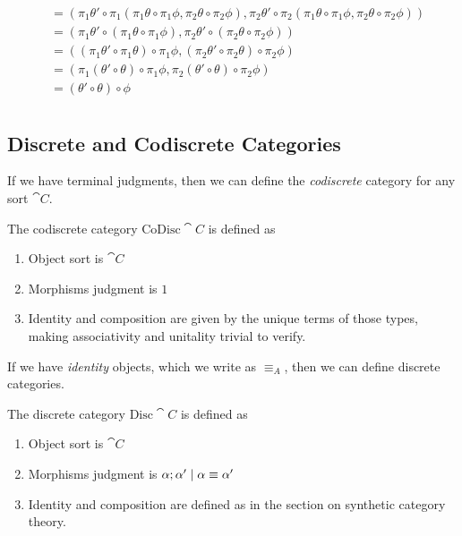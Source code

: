 \documentclass{article}
\begin{document}
\begin{definition}
\begin{enumerate}
\begin{align*}
      &= (\pi_1 \theta' \circ \pi_1(\pi_1 \theta \circ \pi_1 \phi, \pi_2 \theta \circ \pi_2 \phi),
      \pi_2 \theta' \circ \pi_2(\pi_1 \theta \circ \pi_1 \phi, \pi_2 \theta \circ \pi_2 \phi))\\
      &= (\pi_1 \theta' \circ (\pi_1 \theta \circ \pi_1 \phi), \pi_2 \theta' \circ (\pi_2 \theta \circ \pi_2 \phi))\\
      &= ((\pi_1 \theta' \circ \pi_1 \theta) \circ \pi_1 \phi, (\pi_2 \theta' \circ \pi_2 \theta) \circ \pi_2 \phi)\\
      &= (\pi_1(\theta' \circ \theta) \circ \pi_1 \phi, \pi_2(\theta' \circ \theta) \circ \pi_2 \phi)\\
      &= (\theta' \circ \theta) \circ \phi \\
    \end{align*}
  \end{enumerate}
\end{definition}

\subsection{Discrete and Codiscrete Categories}

If we have terminal judgments, then we can define the
\emph{codiscrete} category for any sort $\cat C$.
\begin{definition}
  The codiscrete category $\textrm{CoDisc} \cat C$ is defined as
  \begin{enumerate}
  \item Object sort is $\cat C$
  \item Morphisms judgment is $1$
  \item Identity and composition are given by the unique terms of
    those types, making associativity and unitality trivial to verify.
  \end{enumerate}
\end{definition}

If we have \emph{identity} objects, which we write as $\equiv_A$, then we
can define discrete categories.
\begin{definition}
  The discrete category $\textrm{Disc} \cat C$ is defined as
  \begin{enumerate}
  \item Object sort is $\cat C$
  \item Morphisms judgment is $\alpha;\alpha' \mathrel{|} \alpha \equiv \alpha'$
  \item Identity and composition are defined as in the section on
    synthetic category theory.
  \end{enumerate}
\end{definition}
\end{document}
